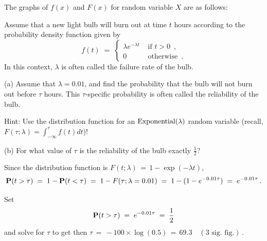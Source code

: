 \begin{ExerciseList}
\item  The graphs of $f(x)$ and $F(x)$ for  random variable $X$ are as follows:

\ee

\Exercise
Assume that a new light bulb will burn out at time $t$ hours according to the probability density function given by 
$$
f(t)\;=\;
\begin{cases}
\lambda e^{-\lambda t} & \text{ if } t >0 \enspace,\\
0 & \text{ otherwise} \enspace .
\end{cases}
$$
In this context, $\lambda$ is often called the failure rate of the bulb.

\be
\item[(a)]Assume that $\lambda=0.01$, and find the probability that the
  bulb will not burn out before $\tau$ hours. This $\tau$-specific probability is often
  called the reliability of the bulb.

Hint: Use the distribution function for an $\mbox{{\rm Exponential}}(\lambda)$ random variable (recall, $F(\tau;\lambda)=\int_{-\infty}^{\tau} f(t) dt$)!

\item[(b)]For what  value of $\tau$ is the reliability of the bulb exactly $\frac{1}{2}$?
\ee
\Answer
\be
\item Since the distribution function is $F(t; \lambda) \,=\,
  1 - \exp( - \lambda t)$,
 \[\mathbf{P}(t>\tau)\;=\;1-\mathbf{P}(t<\tau)\;=\; 1 - F(\tau;\lambda=0.01) \;=\;1-(1-e^{-0.01\tau})\;=\;e^{-0.01\tau}\,.\]

\item Set  \[\mathbf{P}(t>\tau)\;=\;e^{-0.01\tau}\;=\;\frac{1}{2}\]
and solve for $\tau$ to get  then $\tau\,=\,-100\times \log(0.5)\,=\,69.3\quad (\text{3 sig. fig.})$\,.
\ee


\end{ExerciseList}
